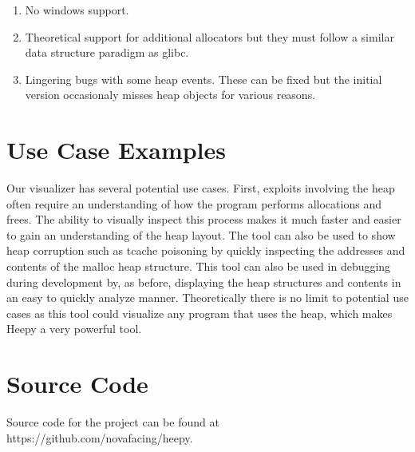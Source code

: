 \documentclass[12pt]{article}
\begin{document}
\begin{enumerate}
    \item No windows support.
    \item Theoretical support for additional allocators but they must follow a similar data structure paradigm as glibc.
    \item Lingering bugs with some heap events. These can be fixed but the initial version occasionaly misses heap objects for various reasons.
\end{enumerate}

\section{Use Case Examples}

Our visualizer has several potential use cases. First, exploits involving the heap often require an understanding of how the program performs allocations and frees. The ability to visually inspect this process makes it much faster and easier to gain an understanding of the heap layout. The tool can also be used to show heap corruption such as tcache poisoning by quickly inspecting the addresses and contents of the malloc heap structure. This tool can also be used in debugging during development by, as before, displaying the heap structures and contents in an easy to quickly analyze manner. Theoretically there is no limit to potential use cases as this tool could visualize any program that uses the heap, which makes Heepy a very powerful tool. \\

\section{Source Code}

Source code for the project can be found at https://github.com/novafacing/heepy.
\end{document}

